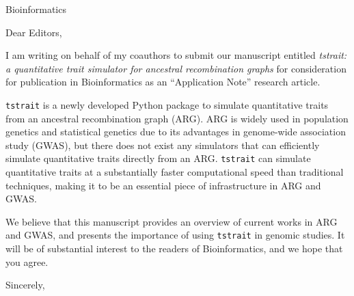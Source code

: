 \documentclass{letter}
\begin{document}
\begin{letter}{Bioinformatics}

\opening{Dear Editors,}

I am writing on behalf of my coauthors to submit our manuscript entitled
\emph{tstrait: a quantitative trait simulator for ancestral recombination graphs}
for consideration for publication in Bioinformatics
as an ``Application Note'' research article.

\texttt{tstrait} is a newly developed Python package to simulate quantitative traits from an ancestral recombination graph (ARG). ARG is widely used in population genetics and statistical genetics due to its advantages in genome-wide association study (GWAS), but there does not exist any simulators that can efficiently simulate quantitative traits directly from an ARG. \texttt{tstrait} can simulate quantitative traits at a substantially faster computational speed than traditional techniques, making it to be an essential piece of infrastructure in ARG and GWAS.

We believe that this manuscript provides an overview of current works in ARG and GWAS, and presents the importance of using \texttt{tstrait} in genomic studies. It will be of substantial interest to the readers of Bioinformatics, and we hope that you agree.

\closing{Sincerely,}

\end{letter}
\end{document}
